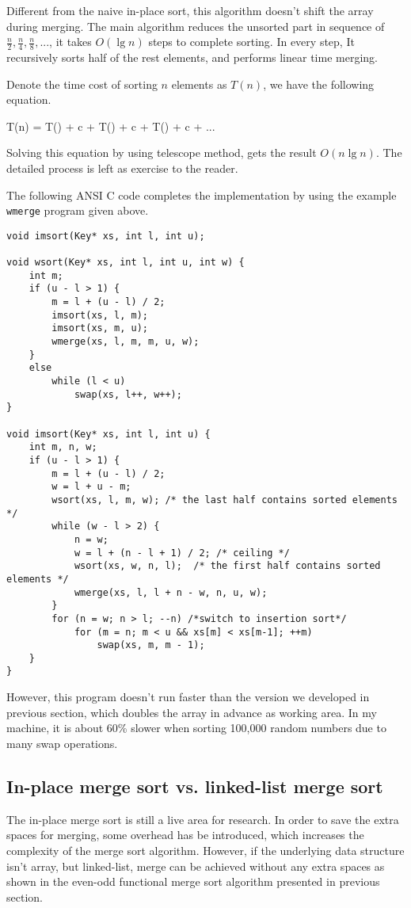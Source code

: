 \documentclass[UTF8]{article}
\begin{document}
Different from the naive in-place sort, this algorithm doesn't shift the array during merging. The main
algorithm reduces the unsorted part in sequence of $\frac{n}{2}, \frac{n}{4}, \frac{n}{8}, ...$, it takes $O(\lg n)$ steps to complete
sorting. In every step, It recursively sorts half of the rest elements, and performs linear time merging.

Denote the time cost of sorting $n$ elements as $T(n)$, we have the following equation.

\be
T(n) = T() + c  + T() + c  + T() + c  + ...
\ee

Solving this equation by using telescope method, gets the result $O(n \lg n)$. The detailed process is
left as exercise to the reader.

The following ANSI C code completes the implementation by using the example \verb|wmerge| program given
above.

\lstset{language=C}
\begin{lstlisting}
void imsort(Key* xs, int l, int u);

void wsort(Key* xs, int l, int u, int w) {
    int m;
    if (u - l > 1) {
        m = l + (u - l) / 2;
        imsort(xs, l, m);
        imsort(xs, m, u);
        wmerge(xs, l, m, m, u, w);
    }
    else
        while (l < u)
            swap(xs, l++, w++);
}

void imsort(Key* xs, int l, int u) {
    int m, n, w;
    if (u - l > 1) {
        m = l + (u - l) / 2;
        w = l + u - m;
        wsort(xs, l, m, w); /* the last half contains sorted elements */
        while (w - l > 2) {
            n = w;
            w = l + (n - l + 1) / 2; /* ceiling */
            wsort(xs, w, n, l);  /* the first half contains sorted elements */
            wmerge(xs, l, l + n - w, n, u, w);
        }
        for (n = w; n > l; --n) /*switch to insertion sort*/
            for (m = n; m < u && xs[m] < xs[m-1]; ++m)
                swap(xs, m, m - 1);
    }
}
\end{lstlisting}

However, this program doesn't run faster than the version we developed in previous section, which doubles
the array in advance as working area. In my machine, it is about 60\% slower when sorting 100,000 random
numbers due to many swap operations.

\subsection{In-place merge sort vs. linked-list merge sort}
The in-place merge sort is still a live area for research. In order to save the extra spaces for merging,
some overhead has be introduced, which increases the complexity of the merge sort algorithm. However, if
the underlying data structure isn't array, but linked-list, merge can be achieved without any extra spaces
as shown in the even-odd functional merge sort algorithm presented in previous section.
\end{document}
